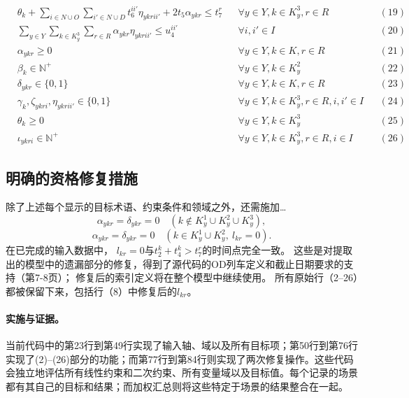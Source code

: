 \documentclass[11pt]{article}
\begin{document}
\[\begin{aligned}
& \theta_k + \sum_{i \in N \cup O} \sum_{i' \in N \cup D} t_6^{ii'} \eta_{ykrii'} + 2 t_5 \alpha_{ykr} \leq t_7^r && \forall y \in Y, k \in K^3_y, r \in R && (19) \\
& \sum_{y \in Y} \sum_{k \in K^3_y} \sum_{r \in R} \alpha_{ykr} \eta_{ykrii'} \leq u_4^{ii'} && \forall i, i' \in I && (20) \\
& \alpha_{ykr} \geq 0 && \forall y \in Y, k \in K, r \in R && (21) \\
& \beta_k \in \mathbb{N}^+ && \forall y \in Y, k \in K^2_y && (22) \\
& \delta_{ykr} \in \{0, 1\} && \forall y \in Y, k \in K, r \in R && (23) \\
& \gamma_k, \zeta_{ykri}, \eta_{ykrii'} \in \{0, 1\} && \forall y \in Y, k \in K^3_y, r \in R, i, i' \in I && (24) \\
& \theta_k \geq 0 && \forall y \in Y, k \in K^3_y && (25) \\
& \iota_{ykri} \in \mathbb{N}^+ && \forall y \in Y, k \in K^3_y, r \in R, i \in I && (26)
\end{aligned}
\]


\subsection*{明确的资格修复措施}
除了上述每个显示的目标术语、约束条件和领域之外，还需施加…
\[
\alpha_{ykr}=\delta_{ykr}=0
\quad(k\notin K_y^1\cup K_y^2\cup K_y^3),
\]
\[
\alpha_{ykr}=\delta_{ykr}=0
\quad(k\in K_y^1\cup K_y^2,\ l_{kr}=0).
\]
在已完成的输入数据中，
$l_{kr}=0$与$t_2^k+t_4^k>t_7^r$的时间点完全一致。
这些是对提取出的模型中的遗漏部分的修复，得到了源代码的OD列车定义和截止日期要求的支持（第7-8页）；
修复后的索引定义将在整个模型中继续使用。
所有原始行（2–26）都被保留下来，包括行（8）中修复后的$l_{kr}$。

\paragraph{实施与证据。}
当前代码中的第23行到第49行实现了输入轴、域以及所有目标项；第50行到第76行实现了(2)--(26)部分的功能；而第77行到第84行则实现了两次修复操作。这些代码会独立地评估所有线性约束和二次约束、所有变量域以及目标值。每个记录的场景都有其自己的目标和结果；而加权汇总则将这些特定于场景的结果整合在一起。
\end{document}
